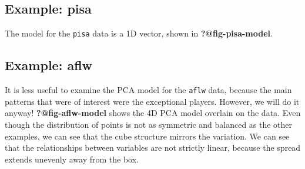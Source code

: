\documentclass[
  letterpaper,
]{krantz}
\newenvironment{Shaded}{\begin{snugshade}}{\end{snugshade}}
\newcommand{\AttributeTok}[1]{\textcolor[rgb]{0.40,0.45,0.13}{#1}}
\newcommand{\ConstantTok}[1]{\textcolor[rgb]{0.56,0.35,0.01}{#1}}
\newcommand{\DecValTok}[1]{\textcolor[rgb]{0.68,0.00,0.00}{#1}}
\newcommand{\FloatTok}[1]{\textcolor[rgb]{0.68,0.00,0.00}{#1}}
\newcommand{\FunctionTok}[1]{\textcolor[rgb]{0.28,0.35,0.67}{#1}}
\newcommand{\NormalTok}[1]{\textcolor[rgb]{0.00,0.23,0.31}{#1}}
\newcommand{\OtherTok}[1]{\textcolor[rgb]{0.00,0.23,0.31}{#1}}
\newcommand{\SpecialCharTok}[1]{\textcolor[rgb]{0.37,0.37,0.37}{#1}}
\newcommand{\StringTok}[1]{\textcolor[rgb]{0.13,0.47,0.30}{#1}}
\begin{document}
\hypertarget{example-pisa-1}{%
\subsection{Example: pisa}\label{example-pisa-1}}

The model for the \texttt{pisa} data is a 1D vector, shown in
\textbf{?@fig-pisa-model}.

\begin{Shaded}
\end{Shaded}

\hypertarget{example-aflw-1}{%
\subsection{Example: aflw}\label{example-aflw-1}}

It is less useful to examine the PCA model for the \texttt{aflw} data,
because the main patterns that were of interest were the exceptional
players. However, we will do it anyway! \textbf{?@fig-aflw-model} shows
the 4D PCA model overlain on the data. Even though the distribution of
points is not as symmetric and balanced as the other examples, we can
see that the cube structure mirrors the variation. We can see that the
relationships between variables are not strictly linear, because the
spread extends unevenly away from the box.
\end{document}
